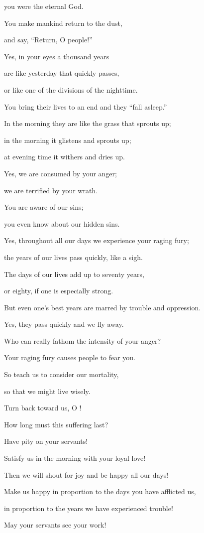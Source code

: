 {\par }{\Q you were the eternal
God.
\par }{\Q {}You make mankind
return
to the dust,
\par }{\Q and say,
“Return,
O people!”
\par }{\Q {}Yes,
in your eyes
a thousand
years
\par }{\Q are like yesterday
that
quickly passes,
\par }{\Q or like one of the divisions of the nighttime.
\par }{\Q {}You bring their lives
to an end
and they “fall
asleep.”
\par }{\Q In the morning
they are like the grass
that sprouts up;
\par }{\Q {}in the morning
it glistens
and sprouts
up;
\par }{\Q at evening
time it withers
and dries up.
\par }{\Q {}Yes,
we are consumed
by your anger;
\par }{\Q we are terrified
by your wrath.
\par }{\Q {}You are aware
of our sins;
\par }{\Q you even know about our hidden sins.
\par }{\Q {}Yes,
throughout all
our days
we experience
your raging fury;
\par }{\Q the years
of our lives pass quickly,
like
a sigh.
\par }{\Q {}The days
of our lives
add up to seventy
years,
\par }{\Q or eighty,
if
one is especially strong.
\par }{\Q But even one’s best
years
are marred by trouble
and oppression.
\par }{\Q Yes,
they pass
quickly
and we fly away.
\par }{\Q {}Who can
really fathom
the intensity
of your
anger?

\par }{\Q Your raging fury
causes people to fear you.
\par }{\Q {}So teach
us to consider
our mortality,
\par }{\Q so that
we might live
wisely.
\par }{\Q {}Turn back
toward us, O
{}!
\par }{\Q How long
must this suffering
last?

\par }{\Q Have pity
on
your servants!
\par }{\Q {}Satisfy
us in the morning
with your loyal love!
\par }{\Q Then we will shout
for joy and be happy
all
our days!
\par }{\Q {}Make us happy
in proportion to the days
you have afflicted
us,
\par }{\Q in proportion to the years
we have experienced
trouble!
\par }{\Q {}May your servants
see your work!

}
